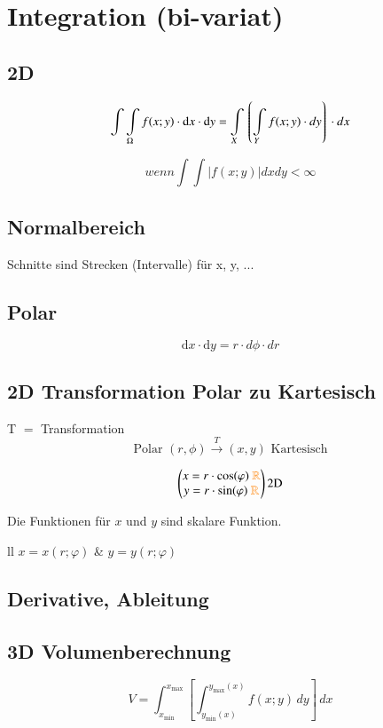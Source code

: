 \newpage
\section{Integration (bi-variat)}

\subsection{2D}

\[
    \int\int\limits_{\Omega}f(x;y)\cdot \mathop{} \! \mathrm{d} x\cdot \mathop{} \! \mathrm{d} y=\int\limits_{X}\left\lgroup\int\limits_{Y}f(x;y)\cdot dy \right\rgroup\cdot dx
\]

\[
    wenn\int\int|f(x;y)|dxdy<\infty
\]

\subsection{Normalbereich}

Schnitte sind Strecken (Intervalle) für x, y, ...

\subsection{Polar}

\[
    \text{d}x \cdot \text{d}y = r \cdot d\phi \cdot dr
\]

\subsection{2D Transformation Polar zu Kartesisch}
T $=$ Transformation
\[
    \text{Polar } (r,\phi) \xrightarrow{T} (x,y) \text{ Kartesisch}
\]

\[
\begin{pmatrix}
    x=r\cdot\cos(\varphi) \text{ } {\color{orange}\mathbb{R}} \\
    y=r\cdot\sin(\varphi) \text{ } {\color{orange}\mathbb{R}} 
\end{pmatrix}
\text{2D}
\]

Die Funktionen für $x$ und $y$ sind skalare Funktion.

    \begin{ctabular}{ll}
        $x=x(r;\varphi)$ & $ y=y(r;\varphi)$
    \end{ctabular}

\subsection{Derivative, Ableitung}


\subsection{3D Volumenberechnung}

$$V=\int_{x_{\min}}^{x_{\max}} \left[\int_{y_{\min}(x)}^{y_{\max}(x)} f\left(x;y\right)  \,dy \right] \,dx $$
\subsection{}
\subsection{}

